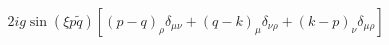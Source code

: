 \begin{equation}
 2ig \sin(\xi p \tilde{q})[(p-q)_{\rho} \delta_{\mu
 \nu}+(q-k)_{\mu} \delta_{\nu \rho}+(k-p)_{\nu} \delta_{\mu \rho}]
 \label{5}
 \end{equation}

